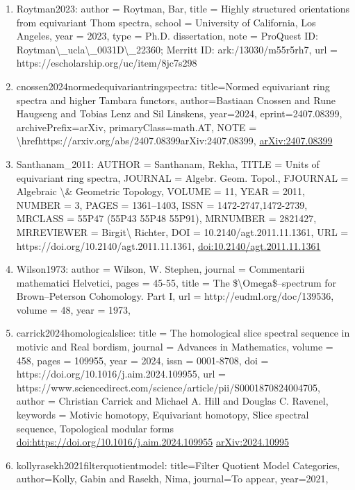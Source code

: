 \documentclass[11pt]{article}
\begin{document}
\begin{enumerate}[leftmargin=*]
  \item Roytman2023: author = Roytman, Bar, title = Highly structured orientations from equivariant Thom spectra, school = University of California, Los Angeles, year = 2023, type = Ph.D. dissertation, note = ProQuest ID: Roytman\textbackslash{}\_ucla\textbackslash{}\_0031D\textbackslash{}\_22360; Merritt ID: ark:/13030/m55r5rh7, url = https://escholarship.org/uc/item/8jc7s298
  \item cnossen2024normedequivariantringspectra: title=Normed equivariant ring spectra and higher Tambara functors, author=Bastiaan Cnossen and Rune Haugseng and Tobias Lenz and Sil Linskens, year=2024, eprint=2407.08399, archivePrefix=arXiv, primaryClass=math.AT, NOTE = \textbackslash{}hrefhttps://arxiv.org/abs/2407.08399arXiv:2407.08399, \href{https://arxiv.org/abs/2407.08399}{arXiv:2407.08399}
  \item Santhanam\_2011: AUTHOR = Santhanam, Rekha, TITLE = Units of equivariant ring spectra, JOURNAL = Algebr. Geom. Topol., FJOURNAL = Algebraic \textbackslash{}\& Geometric Topology, VOLUME = 11, YEAR = 2011, NUMBER = 3, PAGES = 1361--1403, ISSN = 1472-2747,1472-2739, MRCLASS = 55P47 (55P43 55P48 55P91), MRNUMBER = 2821427, MRREVIEWER = Birgit\textbackslash{} Richter, DOI = 10.2140/agt.2011.11.1361, URL = https://doi.org/10.2140/agt.2011.11.1361, \href{https://doi.org/10.2140/agt.2011.11.1361}{doi:10.2140/agt.2011.11.1361}
  \item Wilson1973: author = Wilson, W. Stephen, journal = Commentarii mathematici Helvetici, pages = 45-55, title = The \$\textbackslash{}Omega\$--spectrum for Brown--Peterson Cohomology. Part I, url = http://eudml.org/doc/139536, volume = 48, year = 1973,
  \item carrick2024homologicalslice: title = The homological slice spectral sequence in motivic and Real bordism, journal = Advances in Mathematics, volume = 458, pages = 109955, year = 2024, issn = 0001-8708, doi = https://doi.org/10.1016/j.aim.2024.109955, url = https://www.sciencedirect.com/science/article/pii/S0001870824004705, author = Christian Carrick and Michael A. Hill and Douglas C. Ravenel, keywords = Motivic homotopy, Equivariant homotopy, Slice spectral sequence, Topological modular forms \href{https://doi.org/https://doi.org/10.1016/j.aim.2024.109955}{doi:https://doi.org/10.1016/j.aim.2024.109955} \href{https://arxiv.org/abs/2024.10995}{arXiv:2024.10995}
  \item kollyrasekh2021filterquotientmodel: title=Filter Quotient Model Categories, author=Kolly, Gabin and Rasekh, Nima, journal=To appear, year=2021,

\end{enumerate}
\end{document}
